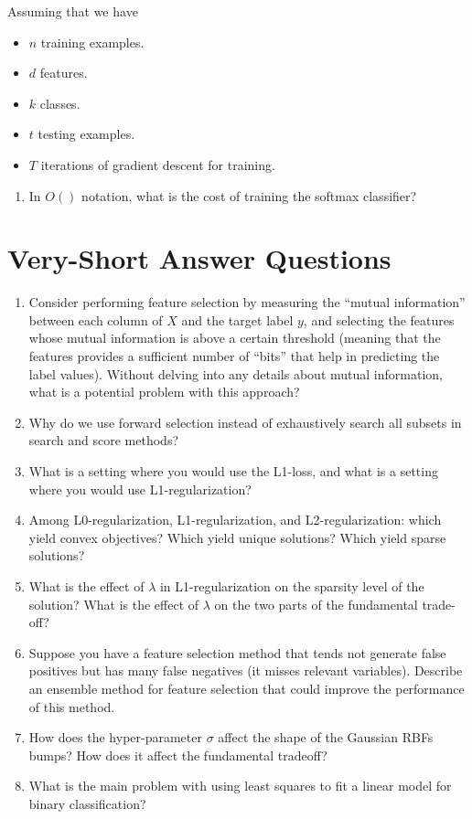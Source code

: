 \documentclass{article}
\def\blu#1{{\color{blu}#1}}
\def\items#1{\begin{itemize}#1\end{itemize}}
\def\enum#1{\begin{enumerate}#1\end{enumerate}}
\begin{document}
Assuming that we have
\items{
\item $n$ training examples.
\item $d$ features.
\item $k$ classes.
\item $t$ testing examples.
\item $T$ iterations of gradient descent for training.
}
\blu{\enum{
\item In $O()$ notation, what is the cost of training the softmax classifier?
}}



\section{Very-Short Answer Questions}

\enum{
\item Consider performing feature selection by measuring the ``mutual information'' between each column of $X$ and the target label $y$, and selecting the features whose mutual information is above a certain threshold (meaning that the features provides a sufficient number of ``bits'' that help in predicting the label values). Without delving into any details about mutual information, what is a potential problem with this approach?
\item Why do we use forward selection instead of exhaustively search all subsets in search and score methods?
\item What is a setting where you would use the L1-loss, and what is a setting where you would use L1-regularization?
\item Among L0-regularization, L1-regularization, and L2-regularization: which yield convex objectives? Which yield unique solutions? Which yield sparse solutions?
\item What is the effect of $\lambda$ in L1-regularization on the sparsity level of the solution? What is the effect of $\lambda$ on the two parts of the fundamental trade-off?
\item Suppose you have a feature selection method that tends not generate false positives but has many false negatives (it misses relevant variables). Describe an ensemble method for feature selection that could improve the performance of this method.
\item How does the hyper-parameter $\sigma$ affect the shape of the Gaussian RBFs bumps? How does it affect the fundamental tradeoff?
\item What is the main problem with using least squares to fit a linear model for binary classification?
}
\end{document}
